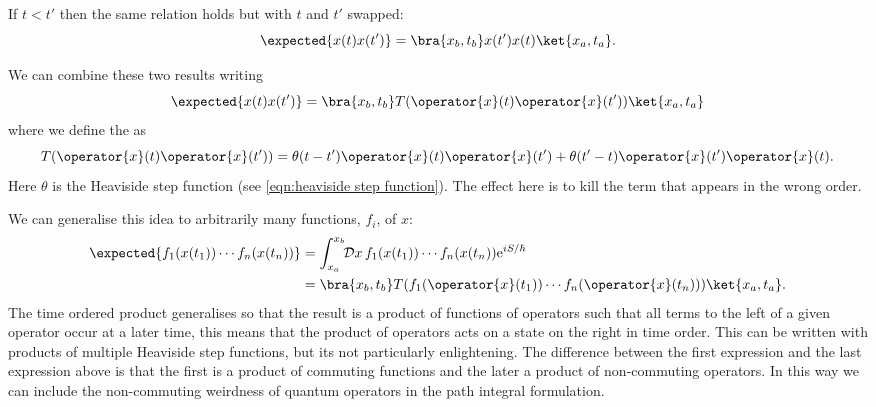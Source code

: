 \documentclass[fleqn]{NotesClass}
\newcommand*{\e}{\mathrm{e}}
\newcommand*{\timeorder}{T}
\begin{document}
    If \(t < t'\) then the same relation holds but with \(t\) and \(t'\) swapped:
    \begin{equation}
        \expected{x(t)x(t')} = \bra{x_b, t_b} x(t') x(t) \ket{x_a, t_a}.
    \end{equation}
    
    We can combine these two results writing
    \begin{equation}
        \expected{x(t)x(t')} = \bra{x_b, t_b} \timeorder (\operator{x}(t)\operator{x}(t')) \ket{x_a, t_a}
    \end{equation}
    where we define the  as
    \begin{equation}
        \timeorder (\operator{x}(t)\operator{x}(t')) = \theta(t - t')\operator{x}(t)\operator{x}(t') + \theta(t' - t)\operator{x}(t')\operator{x}(t).
    \end{equation}
    Here \(\theta\) is the Heaviside step function (see \cref{eqn:heaviside step function}).
    The effect here is to kill the term that appears in the wrong order.
    
    We can generalise this idea to arbitrarily many functions, \(f_i\), of \(x\):
    \begin{align}
        \expected{f_1(x(t_1)) \dotsm f_n(x(t_n))} &= \int_{x_a}^{x_b} \!\! \DL{x} \, f_1(x(t_1)) \dotsm f_n(x(t_n)) \e^{iS/\hbar}\\
        \hspace{4cm}&= \bra{x_b, t_b} \timeorder (f_1(\operator{x}(t_1)) \dotsm f_n(\operator{x}(t_n)))\ket{x_a, t_a}.
    \end{align}
    The time ordered product generalises so that the result is a product of functions of operators such that all terms to the left of a given operator occur at a later time, this means that the product of operators acts on a state on the right in time order.
    This can be written with products of multiple Heaviside step functions, but its not particularly enlightening.
    The difference between the first expression and the last expression above is that the first is a product of commuting functions and the later a product of non-commuting operators.
    In this way we can include the non-commuting weirdness of quantum operators in the path integral formulation.
    
\end{document}
